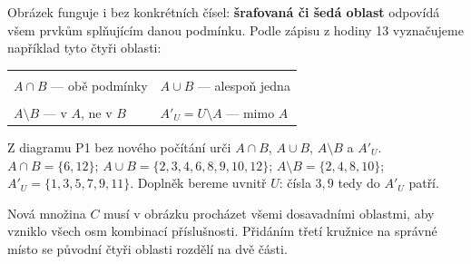 \documentclass[11pt,a4paper]{article}
\newcommand{\vennTwo}[1]{%
\begin{tikzpicture}[scale=.58,baseline=(current bounding box.center)]
  \path[use as bounding box] (-3.25,-2.12) rectangle (3.25,2.12);
  #1
  \draw[thick] (-3.05,-1.86) rectangle (3.05,1.88);
  \draw[thick] (-.9,0) circle (1.45);
  \draw[thick] (.9,0) circle (1.45);
  \node at (-1.72,1.53) {$A$};
  \node at (1.72,1.53) {$B$};
  \node[anchor=north east] at (2.97,1.82) {$U$};
\end{tikzpicture}}
\newcommand{\shadeIntersection}{\begin{scope}\clip (-.9,0) circle (1.45);\fill[black!25] (.9,0) circle (1.45);\end{scope}}
\newcommand{\shadeUnion}{\fill[black!25] (-.9,0) circle (1.45);\fill[black!25] (.9,0) circle (1.45);}
\newcommand{\shadeDifference}{\begin{scope}\clip (-.9,0) circle (1.45);\fill[black!25] (-3,-1.8) rectangle (3,1.8);\fill[white] (.9,0) circle (1.45);\end{scope}}
\newcommand{\shadeComplement}{\fill[black!25] (-3.05,-1.86) rectangle (3.05,1.88);\fill[white] (-.9,0) circle (1.45);}
\begin{document}

Obrázek funguje i bez konkrétních čísel: \textbf{šrafovaná či šedá
oblast} odpovídá všem prvkům splňujícím danou podmínku.
Podle zápisu z hodiny 13 vyznačujeme například tyto čtyři oblasti:

\begin{center}
\begin{tabularx}{\linewidth}{@{}XX@{}}
\centering\vennTwo{\shadeIntersection} & \centering\vennTwo{\shadeUnion}\tabularnewline[-.2em]
\centering $A\cap B$ — obě podmínky & \centering $A\cup B$ — alespoň jedna\tabularnewline[.55em]
\centering\vennTwo{\shadeDifference} & \centering\vennTwo{\shadeComplement}\tabularnewline[-.2em]
\centering $A\setminus B$ — v $A$, ne v $B$ & \centering $A'_U=U\setminus A$ — mimo $A$\tabularnewline
\end{tabularx}
\end{center}


\begin{prikladReseniBox}[title={Příklad 2}]
Z diagramu P1 bez nového počítání urči
$A\cap B$, $A\cup B$, $A\setminus B$ a $A'_U$.
\tcblower
$A\cap B=\{6,12\}$;
$A\cup B=\{2,3,4,6,8,9,10,12\}$;
$A\setminus B=\{2,4,8,10\}$;
$A'_U=\{1,3,5,7,9,11\}$.
Doplněk bereme uvnitř $U$: čísla $3,9$ tedy do $A'_U$ patří.
\end{prikladReseniBox}

Nová množina $C$ musí v obrázku procházet všemi dosavadními oblastmi,
aby vzniklo všech osm kombinací příslušnosti. Přidáním třetí kružnice
na správné místo se původní čtyři oblasti rozdělí na dvě části.
\end{document}
